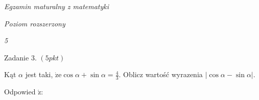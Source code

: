 \documentclass[a4paper,12pt]{article}
\begin{document}
{\it Egzamin maturalny z matematyki}

{\it Poziom rozszerzony}

{\it 5}

Zadanie 3. $(5pkt)$

Kąt $\alpha$ jest taki, $\displaystyle \dot{\mathrm{z}}\mathrm{e}\cos\alpha+\sin\alpha=\frac{4}{3}$. Oblicz wartość wyrazenia $|\cos\alpha-\sin\alpha|.$

Odpowied $\acute{\mathrm{z}}$:
\end{document}
